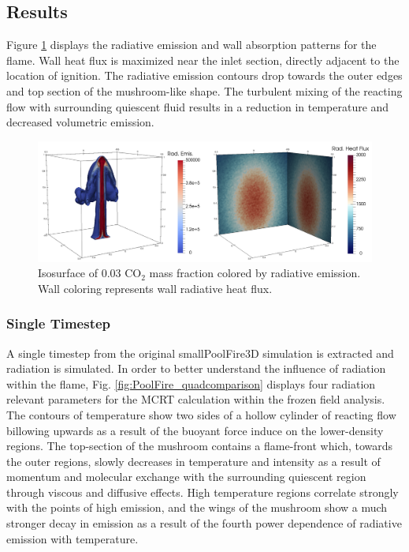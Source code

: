 \subsection{Results}
Figure \ref{fig:PoolFire_radiationcontours} displays the radiative emission and wall absorption patterns for the flame. Wall heat flux is maximized near the inlet section, directly adjacent to the location of ignition. 
The radiative emission contours drop towards the outer edges and top section of the mushroom-like shape. The turbulent mixing of the reacting flow with surrounding quiescent fluid results in a reduction in temperature and decreased volumetric emission.  

\begin{figure}
\includegraphics[width=\linewidth]{figures/ch4/radiation_contours.png}
\caption{Isosurface of 0.03 CO$_2$ mass fraction colored by radiative emission. Wall coloring represents wall radiative heat flux.}
\label{fig:PoolFire_radiationcontours}
\end{figure}

\subsubsection{Single Timestep}
A single timestep from the original smallPoolFire3D simulation is extracted and radiation is simulated.
In order to better understand the influence of radiation within the flame, Fig. \ref{fig:PoolFire_quadcomparison} displays four radiation relevant parameters for the MCRT calculation within the frozen field analysis. 
The contours of temperature show two sides of a hollow cylinder of reacting flow billowing upwards as a result of the buoyant force induce on the lower-density regions.
The top-section of the mushroom contains a flame-front which, towards the outer regions, slowly decreases in temperature and intensity as a result of momentum and molecular exchange with the surrounding quiescent region through viscous and diffusive effects.
High temperature regions correlate strongly with the points of high emission, and the wings of the mushroom show a much stronger decay in emission as a result of the fourth power dependence of radiative emission with temperature.

